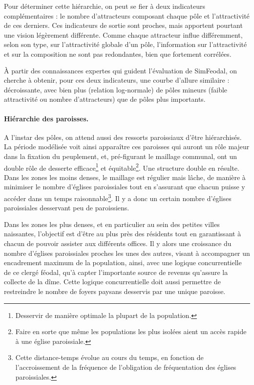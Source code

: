 Pour déterminer cette hiérarchie, on peut se fier à deux indicateurs complémentaires :
le nombre d'attracteurs composant chaque pôle et l'attractivité de ces derniers.
Ces indicateurs de sortie sont proches, mais apportent pourtant une vision légèrement différente.
Comme chaque attracteur influe différemment, selon son type, sur l'attractivité globale d'un pôle, l'information sur l'attractivité et sur la composition ne sont pas redondantes, bien que fortement corrélées.

À partir des connaissances expertes qui guident l'évaluation de SimFeodal, on cherche à obtenir, pour ces deux indicateurs, une courbe d'allure similaire : décroissante, avec bien plus (relation log-normale) de pôles mineurs (faible attractivité ou nombre d'attracteurs) que de pôles plus importants.

\paragraph{Hiérarchie des paroisses.}\label{par:hierarchie-paroisses}

A l'instar des pôles, on attend aussi des ressorts paroissiaux d'être hiérarchisés.
La période modélisée voit ainsi apparaître ces paroisses qui auront un rôle majeur dans la fixation du peuplement, et, pré-figurant le maillage communal, ont un double rôle de desserte efficace\footnote{Desservir de manière optimale la plupart de la population.} et équitable\footnote{Faire en sorte que même les populations les plus isolées aient un accès rapide à une église paroissiale.}.
Une structure double en résulte.
Dans les zones les moins denses, le maillage est régulier mais lâche, de manière à minimiser le nombre d'églises paroissiales tout en s'assurant que chacun puisse y accéder dans un temps raisonnable\footnote{Cette distance-temps évolue au cours du temps, en fonction de l'accroissement de la fréquence de l'obligation de fréquentation des églises paroissiales.}.
Il y a donc un certain nombre d'églises paroissiales desservant peu de paroissiens.

Dans les zones les plus denses, et en particulier au sein des petites villes naissantes, l'objectif est d'être au plus près des résidents tout en garantissant à chacun de pouvoir assister aux différents offices.
Il y alors une croissance du nombre d'églises paroissiales proches les unes des autres, visant à accompagner un encadrement maximum de la population, ainsi, avec une logique concurrentielle de ce clergé féodal, qu'à capter l'importante source de revenus qu'assure la collecte de la dîme.
Cette logique concurrentielle doit aussi permettre de restreindre le nombre de foyers paysans desservis par une unique paroisse.

